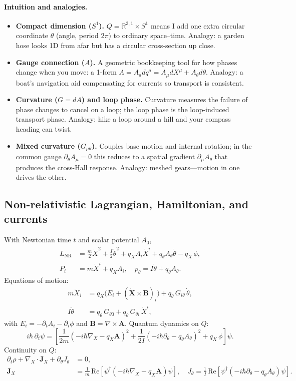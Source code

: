 \paragraph{Intuition and analogies.}
\begin{itemize}
  \item \textbf{Compact dimension ($S^1$).} $Q=\mathbb R^{3,1}\times S^1$ means I add one extra circular coordinate $\theta$ (angle, period $2\pi$) to ordinary space--time. Analogy: a garden hose looks 1D from afar but has a circular cross-section up close.
  \item \textbf{Gauge connection ($A$).} A geometric bookkeeping tool for how phases change when you move: a 1-form $A=A_a dq^a=A_\mu dX^\mu + A_\theta d\theta$. Analogy: a boat's navigation aid compensating for currents so transport is consistent.
  \item \textbf{Curvature ($G=dA$) and loop phase.} Curvature measures the failure of phase changes to cancel on a loop; the loop phase is the loop-induced transport phase. Analogy: hike a loop around a hill and your compass heading can twist.
  \item \textbf{Mixed curvature ($G_{\mu\theta}$).} Couples base motion and internal rotation; in the common gauge $\partial_\theta A_\mu=0$ this reduces to a spatial gradient $\partial_\mu A_\theta$ that produces the cross-Hall response. Analogy: meshed gears---motion in one drives the other.
\end{itemize}

\subsection{Non-relativistic Lagrangian, Hamiltonian, and currents}\label{sec:nr-lagrangian}
With Newtonian time $t$ and scalar potential $A_0$,
\begin{align}
L_{\mathrm{NR}}&=\frac{m}{2}\dot X^2+\frac{I}{2}\dot\theta^2+q_X A_i\dot X^i+q_\theta A_\theta\dot\theta - q_X\,\phi,\\
P_i&=m\dot X^i+q_X A_i,\quad p_\theta=I\dot\theta+q_\theta A_\theta.
\end{align}
Equations of motion:
\begin{align}
m\ddot X_i &= q_X\big(E_i + (\dot{\bm X}\times\bm B)_i\big) + q_\theta\,G_{i\theta}\,\dot\theta,\\
I\ddot\theta &= q_\theta\,G_{\theta 0}+ q_\theta\,G_{\theta i}\,\dot X^i,
\end{align}
with $E_i=-\partial_tA_i-\partial_i\phi$ and $\bm B=\nabla\times\bm A$. Quantum dynamics on $Q$:
\begin{equation}
 i\hbar\,\partial_t\psi = \left[\frac{1}{2m}(-i\hbar\nabla_X-q_X\bm A)^2 + \frac{1}{2I}(-i\hbar\partial_\theta-q_\theta A_\theta)^2 + q_X\,\phi\right]\psi.
\end{equation}
Continuity on $Q$:
\begin{align}
 \partial_t\rho + \nabla_X\!\cdot\bm J_X + \partial_\theta J_\theta&=0,\\
 \bm J_X&=\frac{1}{m}\,\mathrm{Re}[\psi^\dagger(-i\hbar\nabla_X-q_X\bm A)\psi],\quad J_\theta=\frac{1}{I}\,\mathrm{Re}[\psi^\dagger(-i\hbar\partial_\theta-q_\theta A_\theta)\psi].
\end{align}


